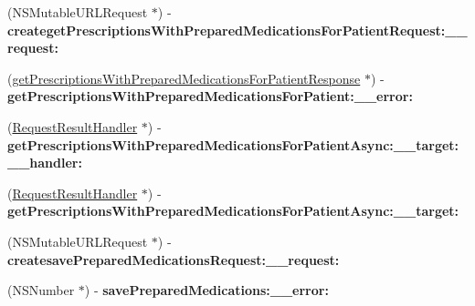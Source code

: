 \begin{DoxyCompactItemize}
\item 
\hypertarget{interface_supply_chain_service_port_binding_a6f578e38e9581cdcd7fb7835f3714667}{}(N\+S\+Mutable\+U\+R\+L\+Request $\ast$) -\/ {\bfseries createget\+Prescriptions\+With\+Prepared\+Medications\+For\+Patient\+Request\+:\+\_\+\+\_\+request\+:}\label{interface_supply_chain_service_port_binding_a6f578e38e9581cdcd7fb7835f3714667}

\item 
\hypertarget{interface_supply_chain_service_port_binding_a11dde68e328ea804333638b187ad1e14}{}(\hyperlink{interfaceget_prescriptions_with_prepared_medications_for_patient_response}{get\+Prescriptions\+With\+Prepared\+Medications\+For\+Patient\+Response} $\ast$) -\/ {\bfseries get\+Prescriptions\+With\+Prepared\+Medications\+For\+Patient\+:\+\_\+\+\_\+error\+:}\label{interface_supply_chain_service_port_binding_a11dde68e328ea804333638b187ad1e14}

\item 
\hypertarget{interface_supply_chain_service_port_binding_a44b401df79b80b77957556041d5b2ed2}{}(\hyperlink{interface_request_result_handler}{Request\+Result\+Handler} $\ast$) -\/ {\bfseries get\+Prescriptions\+With\+Prepared\+Medications\+For\+Patient\+Async\+:\+\_\+\+\_\+target\+:\+\_\+\+\_\+handler\+:}\label{interface_supply_chain_service_port_binding_a44b401df79b80b77957556041d5b2ed2}

\item 
\hypertarget{interface_supply_chain_service_port_binding_ae0bef8ed68a3a68fd747abbff5135a2a}{}(\hyperlink{interface_request_result_handler}{Request\+Result\+Handler} $\ast$) -\/ {\bfseries get\+Prescriptions\+With\+Prepared\+Medications\+For\+Patient\+Async\+:\+\_\+\+\_\+target\+:}\label{interface_supply_chain_service_port_binding_ae0bef8ed68a3a68fd747abbff5135a2a}

\item 
\hypertarget{interface_supply_chain_service_port_binding_ae11b695810c6c668c5bf48c9bc2678b8}{}(N\+S\+Mutable\+U\+R\+L\+Request $\ast$) -\/ {\bfseries createsave\+Prepared\+Medications\+Request\+:\+\_\+\+\_\+request\+:}\label{interface_supply_chain_service_port_binding_ae11b695810c6c668c5bf48c9bc2678b8}

\item 
\hypertarget{interface_supply_chain_service_port_binding_ad83919eac9cb37623b4940969343c2a6}{}(N\+S\+Number $\ast$) -\/ {\bfseries save\+Prepared\+Medications\+:\+\_\+\+\_\+error\+:}\label{interface_supply_chain_service_port_binding_ad83919eac9cb37623b4940969343c2a6}


\end{DoxyCompactItemize}
